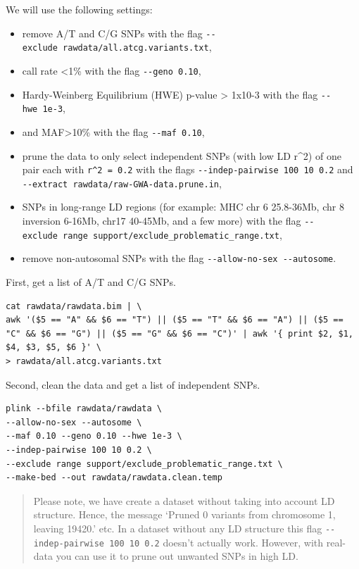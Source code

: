 \documentclass[
]{book}
\providecommand{\tightlist}{%
  \setlength{\itemsep}{0pt}\setlength{\parskip}{0pt}}
\begin{document}
We will use the following settings:

\begin{itemize}
\tightlist
\item
  remove A/T and C/G SNPs with the flag \texttt{-\/-exclude\ rawdata/all.atcg.variants.txt},
\item
  call rate \textless1\% with the flag \texttt{-\/-geno\ 0.10},
\item
  Hardy-Weinberg Equilibrium (HWE) p-value \textgreater{} 1x10-3 with the flag \texttt{-\/-hwe\ 1e-3},
\item
  and MAF\textgreater10\% with the flag \texttt{-\/-maf\ 0.10},
\item
  prune the data to only select independent SNPs (with low LD r\^{}2) of one pair each with \texttt{r\^{}2\ =\ 0.2} with the flags \texttt{-\/-indep-pairwise\ 100\ 10\ 0.2} and \texttt{-\/-extract\ rawdata/raw-GWA-data.prune.in},
\item
  SNPs in long-range LD regions (for example: MHC chr 6 25.8-36Mb, chr 8 inversion 6-16Mb, chr17 40-45Mb, and a few more) with the flag \texttt{-\/-exclude\ range\ support/exclude\_problematic\_range.txt},
\item
  remove non-autosomal SNPs with the flag \texttt{-\/-allow-no-sex\ -\/-autosome}.
\end{itemize}

First, get a list of A/T and C/G SNPs.

\begin{verbatim}
cat rawdata/rawdata.bim | \
awk '($5 == "A" && $6 == "T") || ($5 == "T" && $6 == "A") || ($5 == "C" && $6 == "G") || ($5 == "G" && $6 == "C")' | awk '{ print $2, $1, $4, $3, $5, $6 }' \
> rawdata/all.atcg.variants.txt
\end{verbatim}

Second, clean the data and get a list of independent SNPs.

\begin{verbatim}
plink --bfile rawdata/rawdata \
--allow-no-sex --autosome \
--maf 0.10 --geno 0.10 --hwe 1e-3 \
--indep-pairwise 100 10 0.2 \
--exclude range support/exclude_problematic_range.txt \
--make-bed --out rawdata/rawdata.clean.temp
\end{verbatim}

\begin{quote}
Please note, we have create a dataset without taking into account LD structure. Hence, the message `Pruned 0 variants from chromosome 1, leaving 19420.' etc. In a dataset without any LD structure this flag \texttt{-\/-indep-pairwise\ 100\ 10\ 0.2} doesn't actually work. However, with real-data you can use it to prune out unwanted SNPs in high LD.
\end{quote}
\end{document}
